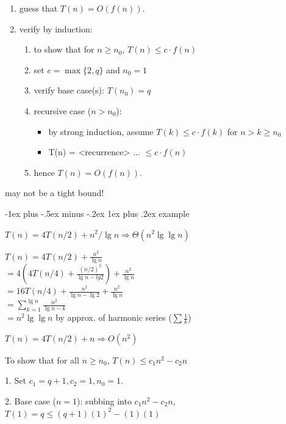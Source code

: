 \documentclass[10pt, landscape]{article}
\makeatletter
\renewcommand{\subsubsection}{\@startsection{subsubsection}{3}{0mm}%
  {-1ex plus -.5ex minus -.2ex}%
  {1ex plus .2ex}%
{\normalfont\small\bfseries}}%
\makeatother
\begin{document}
\begin{multicols*}{4}
  \begin{enumerate}
    \item guess that $T(n) = O(f(n))$. 
    \item verify by induction:
      \begin{enumerate}
        \item to show that for $n \geq n_0$, $T(n) \leq c \cdot f(n)$
        \item set $c = \max\{2, q\}$ and $n_0 = 1$
        \item verify base case(s): $T(n_0) = q$
        \item recursive case ($n > n_0$):
          \begin{itemize}
            \item by strong induction, assume $T(k) \leq c \cdot f(k)$ for $n > k \geq n_0$
            \item T(n) = <recurrence> ... $\leq c \cdot f(n)$
          \end{itemize}
        \item hence $T(n) = O(f(n))$.
      \end{enumerate}
  \end{enumerate}
  \attention may not be a tight bound!

  \subsubsection{example}

  \begin{niceproof}
    $T(n) = 4T(n/2) + n^2/\lg n \Rightarrow \Theta(n^2\lg \lg n)$

    $T(n) = 4T(n/2) + \frac{n^2}{\lg n}$ \\
    $= 4( 4T(n/4) + \frac{(n/2)^2}{\lg n - lg 2} ) + \frac{n^2}{\lg n}$ \\ 
    $= 16 T(n/4) + \frac{n^2}{\lg n - \lg 2} + \frac{n^2}{\lg n}$ \\
    $= \sum\limits^{\lg n}_{k=1} \frac{n^2}{\lg n - k}$ \\
    $= n^2 \lg \lg n$ by approx. of harmonic series ($\sum\frac{1}{k}$)
  \end{niceproof}

  \begin{niceproof}
    $T(n) = 4T(n/2) + n \Rightarrow O(n^2)$

    To show that for all $n \geq n_0$, $T(n) \leq c_1n^2 - c_2n$

    1. Set $c_1 = q+1, c_2 = 1, n_0 = 1$. 

    2. Base case ($n=1$): subbing into $c_1n^2 - c_2n$,
    $T(1) = q \leq (q+1)(1)^2 - (1)(1)$ 


\end{niceproof}
\end{multicols*}
\end{document}
